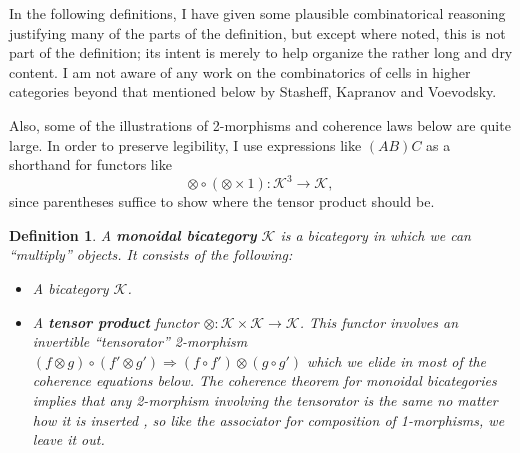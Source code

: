 \documentclass{article}
\newtheorem{defn}{Definition}
\newcommand{\tensor}{\otimes}
\newcommand{\C}{ {\mathcal{K}}  }
\begin{document}
In the following definitions, I have given some plausible combinatorical reasoning justifying many of the parts of the definition, but except where noted, this is not part of the definition; its intent is merely to help organize the rather long and dry content.  I am not aware of any work on the combinatorics of cells in higher categories beyond that mentioned below by Stasheff, Kapranov and Voevodsky.  

Also, some of the illustrations of 2-morphisms and coherence laws below are quite large.  In order to preserve legibility, I use expressions like $(A B) C$ as a shorthand for functors like
      \[\tensor \circ (\tensor \times 1): \C^3 \to \C,\]
since parentheses suffice to show where the tensor product should be.

\begin{defn} A {\bf monoidal bicategory} $\C$ is a bicategory in which we can ``multiply'' objects.  It consists of the following: \\
  
\begin{itemize}
\item A bicategory $\C$.
\item A {\bf tensor product} functor $\otimes:\C \times \C \rightarrow \C$.  This functor involves an invertible ``tensorator'' 2-morphism $(f \otimes g) \circ (f' \otimes g') \Rightarrow (f \circ f') \otimes (g \circ g')$ which we elide in most of the coherence equations below.  The coherence theorem for monoidal bicategories implies that any 2-morphism involving the tensorator is the same no matter how it is inserted \cite[Remark~3.1.6]{Gurski}, so like the associator for composition of 1-morphisms, we leave it out.


\end{itemize}
\end{defn}
\end{document}
